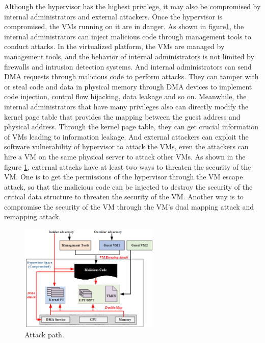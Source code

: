\documentclass[10pt, numbers, preprint ]{sigplanconf}
\begin{document}
{Although the hypervisor has the highest privilege, it may also be compromised by internal administrators and external attackers. %
Once the hypervisor is compromised, the VMs running on it are in danger. As shown in figure\ref{fg1_attk_aprch}, the internal administrators can inject malicious code through management tools to conduct attacks. In the virtualized platform, the VMs are managed by management tools, and the behavior of internal administrators is not limited by firewalls and intrusion detection systems. And internal administrators can send DMA requests through malicious code to perform attacks. They can tamper with or steal code and data in physical memory through DMA devices to implement code injection, control flow hijacking, data leakage and so on. Meanwhile, the internal administrators that have many privileges also can directly modify the kernel page table that provides the mapping between the guest address and physical address. %
Through the kernel page table, they can get crucial information of VMs leading to information leakage. And external attackers can exploit the software vulnerability of hypervisor to attack the VMs, even the attackers can hire a VM on the same physical server to attack other VMs. As shown in the figure \ref{fg1_attk_aprch}, external attacks have at least two ways to threaten the security of the VM. One is to get the permissions of the hypervisor through the VM escape attack, so that the malicious code can be injected to destroy the security of the critical data structure to threaten the security of the VM. Another way is to compromise the security of the VM through the VM's dual mapping attack and remapping attack.
\begin{figure}[htbp]
	\centerline{\includegraphics[height=2.00in]{figures/p1.png}}
	\caption{Attack path.}
	\label{fg1_attk_aprch}
\end{figure}

}
\end{document}
